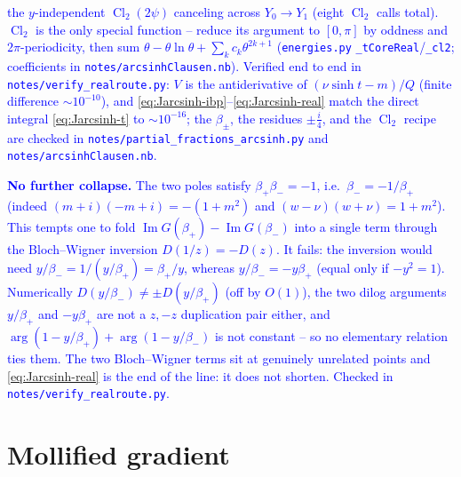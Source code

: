 \documentclass[11pt]{article}
\numberwithin{equation}{section}
\newcommand{\cam}[1]{\textcolor{blue}{#1}}
\begin{document}
\cam{the $y$-independent $\operatorname{Cl}_2(2\psi)$ canceling across $Y_0\!\to\!Y_1$ (eight
$\operatorname{Cl}_2$ calls total). $\operatorname{Cl}_2$ is the only special function -- reduce its argument
to $[0,\pi]$ by oddness and $2\pi$-periodicity, then sum $\theta-\theta\ln\theta+\sum_k c_k\theta^{2k+1}$
(\texttt{energies.py} \texttt{\_tCoreReal}/\texttt{\_cl2}; coefficients in \texttt{notes/arcsinhClausen.nb}).
Verified end to end in \texttt{notes/verify\_realroute.py}: $V$ is the antiderivative of
$(\nu\sinh t-m)/Q$ (finite difference $\sim10^{-10}$), and \eqref{eq:Jarcsinh-ibp}--\eqref{eq:Jarcsinh-real}
match the direct integral \eqref{eq:Jarcsinh-t} to $\sim10^{-16}$; the $\beta_\pm$, the residues
$\pm\tfrac i4$, and the $\operatorname{Cl}_2$ recipe are checked in
\texttt{notes/partial\_fractions\_arcsinh.py} and \texttt{notes/arcsinhClausen.nb}.}

\cam{\textbf{No further collapse.} The two poles satisfy $\beta_+\beta_-=-1$, i.e.\ $\beta_-=-1/\beta_+$
(indeed $(m+i)(-m+i)=-(1+m^2)$ and $(w-\nu)(w+\nu)=1+m^2$). This tempts one to fold
$\operatorname{Im}G(\beta_+)-\operatorname{Im}G(\beta_-)$ into a single term through the Bloch--Wigner
inversion $D(1/z)=-D(z)$. It fails: the inversion would need $y/\beta_-=1/(y/\beta_+)=\beta_+/y$, whereas
$y/\beta_-=-y\beta_+$ (equal only if $-y^2=1$). Numerically $D(y/\beta_-)\neq\pm D(y/\beta_+)$ (off by
$O(1)$), the two dilog arguments $y/\beta_+$ and $-y\beta_+$ are not a $z,-z$ duplication pair either, and
$\arg(1-y/\beta_+)+\arg(1-y/\beta_-)$ is not constant -- so no elementary relation ties them. The two
Bloch--Wigner terms sit at genuinely unrelated points and \eqref{eq:Jarcsinh-real} is the end of the
line: it does not shorten. Checked in \texttt{notes/verify\_realroute.py}.}

\section{Mollified gradient}
\end{document}
